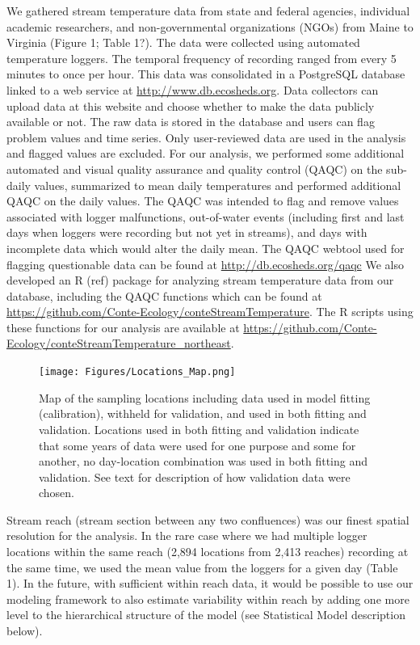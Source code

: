 We gathered stream temperature data from state and federal agencies,
individual academic researchers, and non-governmental organizations
(NGOs) from Maine to Virginia (Figure 1; Table 1?). The data were
collected using automated temperature loggers. The temporal frequency of
recording ranged from every 5 minutes to once per hour. This data was
consolidated in a PostgreSQL database linked to a web service at
\url{http://www.db.ecosheds.org}. Data collectors can upload data at
this website and choose whether to make the data publicly available or
not. The raw data is stored in the database and users can flag problem
values and time series. Only user-reviewed data are used in the analysis
and flagged values are excluded. For our analysis, we performed some
additional automated and visual quality assurance and quality control
(QAQC) on the sub-daily values, summarized to mean daily temperatures
and performed additional QAQC on the daily values. The QAQC was intended
to flag and remove values associated with logger malfunctions,
out-of-water events (including first and last days when loggers were
recording but not yet in streams), and days with incomplete data which
would alter the daily mean. The QAQC webtool used for flagging
questionable data can be found at \url{http://db.ecosheds.org/qaqc} We
also developed an R (ref) package for analyzing stream temperature data
from our database, including the QAQC functions which can be found at
\url{https://github.com/Conte-Ecology/conteStreamTemperature}. The R
scripts using these functions for our analysis are available at
\url{https://github.com/Conte-Ecology/conteStreamTemperature_northeast}.

\begin{figure}[htbp]
\centering
\texttt{[image: Figures/Locations\_Map.png]}
\caption{Map of the sampling locations including data used in model
fitting (calibration), withheld for validation, and used in both fitting
and validation. Locations used in both fitting and validation indicate
that some years of data were used for one purpose and some for another,
no day-location combination was used in both fitting and validation. See
text for description of how validation data were chosen.}
\end{figure}

Stream reach (stream section between any two confluences) was our finest
spatial resolution for the analysis. In the rare case where we had
multiple logger locations within the same reach (2,894 locations from
2,413 reaches) recording at the same time, we used the mean value from
the loggers for a given day (Table 1). In the future, with sufficient
within reach data, it would be possible to use our modeling framework to
also estimate variability within reach by adding one more level to the
hierarchical structure of the model (see Statistical Model description
below).


